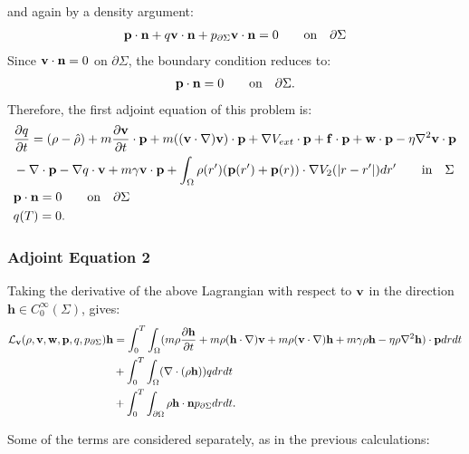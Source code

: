 and again by a density argument:
\begin{align*}
 \mathbf{p} \cdot \mathbf{n}  +  q \mathbf{v} \cdot \mathbf{n}   +{p}_{\partial \Sigma} \mathbf{v} \cdot \mathbf{n} = 0\qquad \text{on} \quad \partial \Sigma
\end{align*}
Since $\mathbf{v} \cdot \mathbf{n} =0$ on $ \partial \Sigma$, the boundary condition reduces to:
\begin{align*}
\mathbf{p} \cdot \mathbf{n} = 0 \qquad \text{on} \quad \partial \Sigma.
\end{align*}
Therefore, the first adjoint equation of this problem is:
\begin{align*}
& \frac{\partial q}{\partial t} = (\rho - \hat {\rho}) +m  \frac{\partial \mathbf{v}}{\partial t}\cdot \mathbf{p} + m ( (\mathbf{v} \cdot \nabla)\mathbf{v}) \cdot \mathbf{p}+ \nabla V_{ext}\cdot \mathbf{p} + \mathbf{f} \cdot \mathbf{p} + \mathbf{w} \cdot \mathbf{p}  - \eta \nabla^2 \mathbf{v} \cdot \mathbf{p} \\
&-\nabla\cdot \mathbf{p}  -  \nabla q \cdot \mathbf{v} + m \gamma \mathbf{v} \cdot \mathbf{p} + \int_\Omega  \rho(r')(\mathbf{p}(r') + \mathbf{p}(r)) \cdot\nabla V_2(|r-r'|)   dr' \qquad \text{in} \quad \Sigma \\
& \mathbf{p} \cdot \mathbf{n} = 0 \qquad \text{on} \quad \partial \Sigma\\
 &q(T) = {0} .
\end{align*}

\subsubsection*{Adjoint Equation 2}
Taking the derivative of the above Lagrangian with respect to $\mathbf{v}$ in the direction $\mathbf{h} \in C_0^\infty(\Sigma)$, gives:
\begin{align*}
\mathcal{L}_{\mathbf{v}}(\rho,\mathbf{v},\mathbf{w},\mathbf{p},q,{p}_{\partial \Sigma})\mathbf{h} &=  \int_0^T \int_\Omega (m \rho \frac{\partial \mathbf{h} }{\partial t} + m \rho (\mathbf{h} \cdot \nabla)\mathbf{v} + m \rho (\mathbf{v} \cdot \nabla)\mathbf{h} + m \gamma \rho \mathbf{h} - \eta \rho \nabla^2 \mathbf{h}) \cdot \mathbf{p} dr dt\\
& + \int_0^T \int_\Omega ( \nabla \cdot (\rho \mathbf{h})) q dr dt\\ 
& +\int_0^T \int_{\partial\Omega} \rho \mathbf{h} \cdot \mathbf{n} {p}_{\partial \Sigma} dr dt.
\end{align*}

Some of the terms are considered separately, as in the previous calculations:

